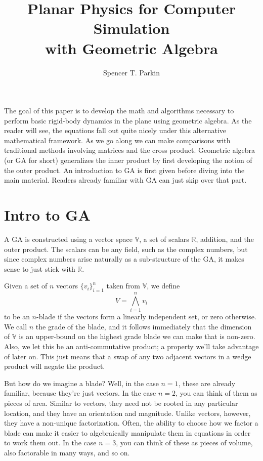 \documentclass[12pt]{article}
\title{Planar Physics for Computer Simulation\\with Geometric Algebra}
\author{Spencer T. Parkin}
\newcommand{\R}{\mathbb{R}}
\newcommand{\V}{\mathbb{V}}
\begin{document}
\maketitle

The goal of this paper is to develop the math and algorithms necessary to perform basic rigid-body dynamics in the plane
using geometric algebra.  As the reader will see, the equations fall out quite nicely under this alternative
mathematical framework.  As we go along we can make comparisons with traditional methods involving
matrices and the cross product.  Geometric algebra (or GA for short) generalizes the inner product by first
developing the notion of the outer product.  An introduction to GA is first given before diving into the
main material.  Readers already familiar with GA can just skip over that part.

\section{Intro to GA}

A GA is constructed using a vector space $\V$, a set of scalars $\R$, addition, and the outer product.  The scalars can be any field,
such as the complex numbers, but since complex numbers arise naturally as a sub-structure of the GA, it makes sense
to just stick with $\R$.

Given a set of $n$ vectors $\{v_i\}_{i=1}^n$ taken from $\V$, we define
\begin{equation}
V = \bigwedge_{i=1}^n v_i
\end{equation}
to be an $n$-blade if the vectors form a linearly independent set, or zero otherwise.
We call $n$ the grade of the blade, and it follows immediately that the dimension of $\V$
is an upper-bound on the highest grade blade we can make that is non-zero.
Also, we let this be an anti-commutative product; a property we'll take advantage of
later on.  This just means that a swap of any two adjacent vectors in a wedge product
will negate the product.

But how do we imagine a blade?  Well, in the case $n=1$, these are already familiar,
because they're just vectors.  In the case $n=2$, you can think of them as pieces
of area.  Similar to vectors, they need not be rooted in any particular location, and
they have an orientation and magnitude.  Unlike vectors, however, they have a non-unique
factorization.  Often, the ability to choose how we factor a blade can make it easier
to algebraically manipulate them in equations in order to work them out.  In the case $n=3$,
you can think of these as pieces of volume, also factorable in many ways, and so on.
\end{document}
